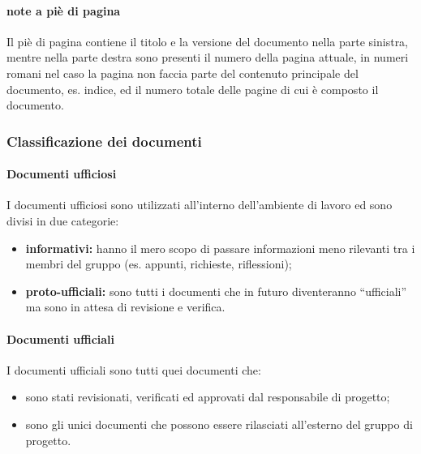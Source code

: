 			\paragraph{note a piè di pagina}
				Il piè di pagina contiene il titolo e la versione del documento nella parte sinistra, mentre nella parte destra sono presenti il numero della pagina attuale, in numeri romani nel caso la pagina non faccia parte del contenuto principale del documento, es. indice, ed il numero totale delle pagine di cui è composto il documento.
		\subsubsection{Classificazione dei documenti}
			\paragraph{Documenti ufficiosi}
				I documenti ufficiosi sono utilizzati all'interno dell'ambiente di lavoro ed sono divisi in due categorie:
				\begin{itemize}
					\item \textbf{informativi:} hanno il mero scopo di passare informazioni meno rilevanti tra i membri del gruppo (es. appunti, richieste, riflessioni);
					\item \textbf{proto-ufficiali:} sono tutti i documenti che in futuro diventeranno ``ufficiali'' ma sono in attesa di revisione e verifica.
				\end{itemize}
			\paragraph{Documenti ufficiali}
				I documenti ufficiali sono tutti quei documenti che:
				\begin{itemize}
					\item sono stati revisionati, verificati ed approvati dal responsabile di progetto;
					\item sono gli unici documenti che possono essere rilasciati all'esterno del gruppo di progetto.
				\end{itemize}
